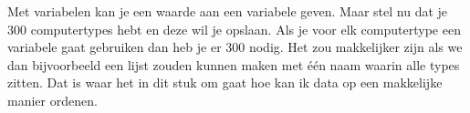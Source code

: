 Met variabelen kan je een waarde aan een variabele geven. Maar stel nu dat je 300 computertypes hebt en deze wil je opslaan. Als je voor elk computertype een variabele gaat gebruiken dan heb je er 300 nodig. Het zou makkelijker zijn als we dan bijvoorbeeld een lijst zouden kunnen maken met \'e\'en naam waarin alle types zitten. Dat is waar het in dit stuk om gaat hoe kan ik data op een makkelijke manier ordenen.
